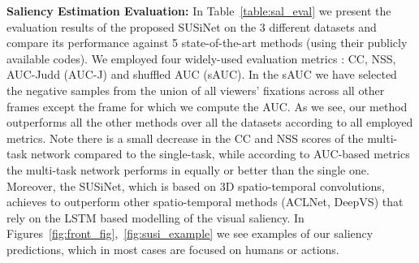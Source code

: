 \documentclass[10pt,twocolumn,letterpaper]{article}
\begin{document}
\noindent\textbf{Saliency Estimation Evaluation:} In Table~\ref{table:sal_eval} we present the evaluation results of the proposed SUSiNet on the 3 different datasets and compare its performance against 5 state-of-the-art methods (using their publicly available codes). We employed four widely-used evaluation metrics \cite{bylinskii2016different}: CC, NSS, AUC-Judd (AUC-J) and shuffled AUC (sAUC). In the sAUC we have selected the negative samples from the union of all viewers' fixations across all other frames except the frame for which we compute the AUC. As we see, our method outperforms all the other methods over all the datasets according to all employed metrics. Note there is a small decrease in the CC and NSS scores of the multi-task network compared to the single-task, while according to AUC-based metrics the multi-task network performs in equally or better than the single one. Moreover, the SUSiNet, which is based on 3D spatio-temporal convolutions, achieves to outperform other spatio-temporal methods (ACLNet, DeepVS) that  rely on the LSTM based modelling of the visual saliency. In Figures~\ref{fig:front_fig},~\ref{fig:susi_example} we see examples of our saliency predictions, which in most cases are focused on humans or actions.
\end{document}
